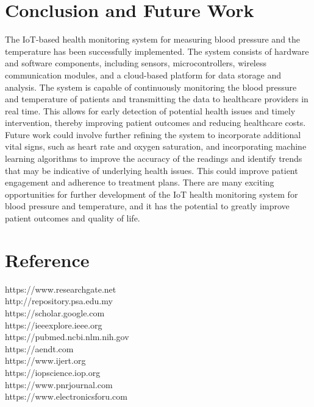 \documentclass[conference]{IEEEtran}
\begin{document}
\section{Conclusion and Future Work}
The IoT-based health monitoring system for measuring blood pressure and the temperature has been successfully implemented. The system consists of hardware and software components, including sensors, microcontrollers, wireless communication modules, and a cloud-based platform for data storage and analysis. The system is capable of continuously monitoring the blood pressure and temperature of patients and transmitting the data to healthcare providers in real time. This allows for early detection of potential health issues and timely intervention, thereby improving patient outcomes and reducing healthcare costs. Future work could involve further refining the system to incorporate additional vital signs, such as heart rate and oxygen saturation, and incorporating machine learning algorithms to improve the accuracy of the readings and identify trends that may be indicative of underlying health issues. This could improve patient engagement and adherence to treatment plans. There are many exciting opportunities for further development of the IoT health monitoring system for blood pressure and temperature, and it has the potential to greatly improve patient outcomes and quality of life.
\section{Reference}
https://www.researchgate.net\\
http://repository.psa.edu.my\\
https://scholar.google.com\\
https://ieeexplore.ieee.org\\
https://pubmed.ncbi.nlm.nih.gov\\
https://aendt.com\\
https://www.ijert.org\\
https://iopscience.iop.org\\
https://www.pnrjournal.com\\
https://www.electronicsforu.com\\
\end{document}
